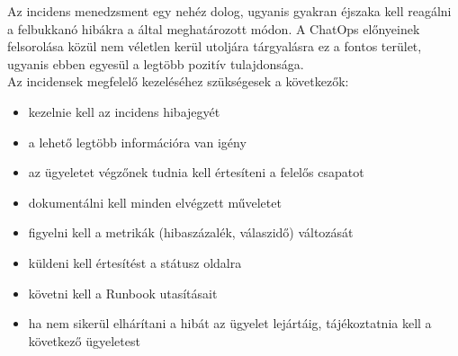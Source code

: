 Az incidens menedzsment egy nehéz dolog, ugyanis gyakran éjszaka kell reagálni a felbukkanó hibákra a  által meghatározott módon. A ChatOps előnyeinek felsorolása közül nem véletlen kerül utoljára tárgyalásra ez a fontos terület, ugyanis ebben egyesül a legtöbb pozitív tulajdonsága.\\
Az incidensek megfelelő kezeléséhez szükségesek a következők:
\begin{itemize}
  \item kezelnie kell az incidens hibajegyét
  \item a lehető legtöbb információra van igény
  \item az ügyeletet végzőnek tudnia kell értesíteni a felelős csapatot
  \item dokumentálni kell minden elvégzett műveletet
  \item figyelni kell a metrikák (hibaszázalék, válaszidő) változását
  \item küldeni kell értesítést a státusz oldalra
  \item követni kell a Runbook utasításait
  \item ha nem sikerül elhárítani a hibát az ügyelet lejártáig, tájékoztatnia kell a következő ügyeletest
\end{itemize}

